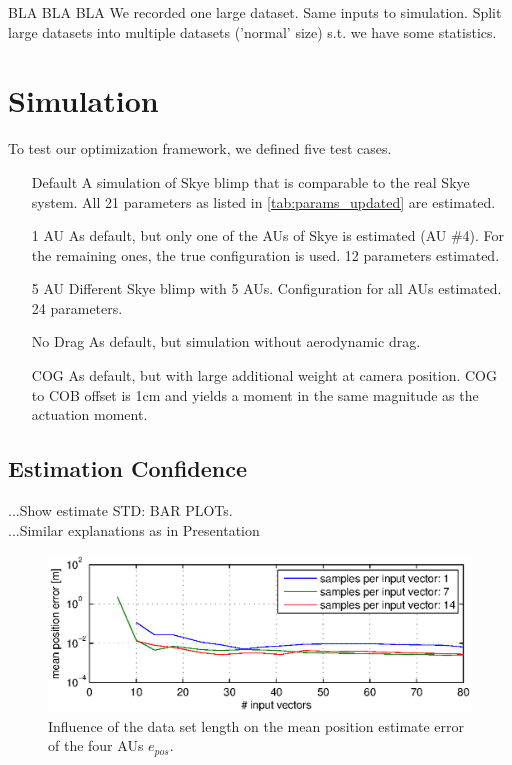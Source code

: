 BLA BLA BLA
We recorded one large dataset.
Same inputs to simulation.
Split large datasets into multiple datasets ('normal' size) s.t. we have some statistics.

\section{Simulation}
To test our optimization framework, we defined five test cases.
\begin{itemize}
\item[Default] A simulation of Skye blimp that is comparable to the real Skye system. All 21 parameters as listed in \cref{tab:params_updated} are estimated.
\item[1 AU] As default, but only one of the AUs of Skye is estimated (AU \#4). For the remaining ones, the true configuration is used. 12 parameters estimated.
\item[5 AU] Different Skye blimp with 5 AUs. Configuration for all AUs estimated. 24 parameters.
\item[No Drag] As default, but simulation without aerodynamic drag.
\item[COG] As default, but with large additional weight at camera position. COG to COB offset is 1cm and yields a moment in the same magnitude as the actuation moment.
\end{itemize}
\subsection{Estimation Confidence}

...Show estimate STD: BAR PLOTs.\\
...Similar explanations as in Presentation

\begin{figure}[hbtp]
\centering
\includegraphics[width = \textwidth]{images/results/input_length_vs_position_error.eps}
\caption{Influence of the data set length on the mean position estimate error of the four AUs $e_{pos}$.}
\label{fig:result_inputlength}
\end{figure}

